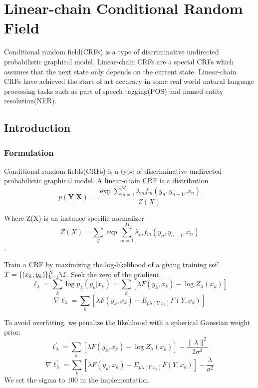 
\chapter[Linear-chain Conditional Random Field]{Linear-chain Conditional Random Field}
Conditional random field(CRFs) is a type of discriminative undirected probabilistic graphical model.
Linear-chain CRFs are a special CRFs which assumes that the next state only depends on the current state. 
Linear-chain CRFs have achieved the start of art accuracy in some real world natural language processing tasks such
as part of speech tagging(POS) and named entity resolution(NER).

\section{Introduction}

\subsection{Formulation}
Conditional random fields(CRFs) is a type of discriminative undirected probabilistic graphical model.
A linear-chain CRF is a distribution
    \[p(\boldsymbol Y | \boldsymbol X) = \frac{\exp{\sum_{m=1}^M \lambda_m f_m(y_n,y_{n-1},x_n)}}{Z(X)}\]

Where Z(X) is an instance specific normalizer
\[Z(X) = \sum_{y} \exp{\sum_{m=1}^M \lambda_m f_m(y_n,y_{n-1},x_n)}\].

Train a CRF by maximizing the log-likelihood of a giving training set \f$ T=\{(x_k,y_k)\}_{k=1}^N \f$.
Seek the zero of the gradient.\\
    \[\ell_{\lambda}=\sum_k \log p_\lambda(y_k|x_k) =\sum_k[\lambda F(y_k,x_k)-\log Z_\lambda(x_k)]\]
    \[\nabla \ell_{\lambda}=\sum_k[\lambda F(y_k,x_k)-E_{p\lambda(Y|x_k)}F(Y,x_k)]\]

To avoid overfitting, we penalize the likelihood with a spherical Gaussian weight prior:\\
    \[\ell_{\lambda}^\prime=\sum_k[\lambda F(y_k,x_k)-\log Z_\lambda(x_k)]-\frac{\lVert \lambda \rVert^2}{2\sigma ^2}\]
    \[\nabla \ell_{\lambda}^\prime=\sum_k[\lambda F(y_k,x_k)-E_{p\lambda(Y|x_k)}F(Y,x_k)]-\frac{\lambda}{\sigma ^2}\]
We set the sigma to 100 in the implementation.

